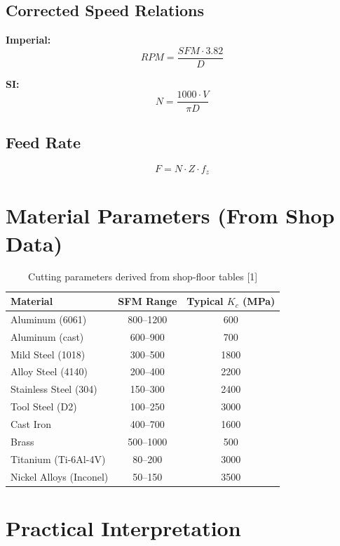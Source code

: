 \documentclass[11pt]{article}
\begin{document}
\subsection{Corrected Speed Relations}
\textbf{Imperial:}
\begin{equation}
RPM = \frac{SFM \cdot 3.82}{D}
\end{equation}

\textbf{SI:}
\begin{equation}
N = \frac{1000 \cdot V}{\pi D}
\end{equation}

\subsection{Feed Rate}
\begin{equation}
F = N \cdot Z \cdot f_z
\end{equation}

\section{Material Parameters (From Shop Data)}

\begin{table}[h!]
\centering
\begin{tabular}{lcc}
\toprule
\textbf{Material} & \textbf{SFM Range} & \textbf{Typical $K_c$ (MPa)} \\
\midrule
Aluminum (6061) & 800--1200 & 600 \\
Aluminum (cast) & 600--900 & 700 \\
Mild Steel (1018) & 300--500 & 1800 \\
Alloy Steel (4140) & 200--400 & 2200 \\
Stainless Steel (304) & 150--300 & 2400 \\
Tool Steel (D2) & 100--250 & 3000 \\
Cast Iron & 400--700 & 1600 \\
Brass & 500--1000 & 500 \\
Titanium (Ti-6Al-4V) & 80--200 & 3000 \\
Nickel Alloys (Inconel) & 50--150 & 3500 \\
\bottomrule
\end{tabular}
\caption{Cutting parameters derived from shop-floor tables [1]}
\end{table}

\section{Practical Interpretation}
\end{document}
